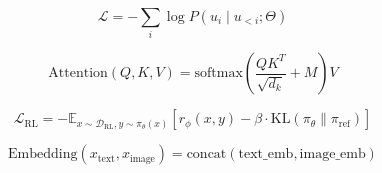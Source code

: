 
\begin{equation}
\mathcal{L} = -\sum_{i} \log P(u_i \mid u_{<i}; \Theta)
\end{equation}

\begin{equation}
\text{Attention}(Q, K, V) = \text{softmax}\left( \frac{QK^T}{\sqrt{d_k}} + M \right) V
\end{equation}

\begin{equation}
\mathcal{L}_{\text{RL}} = -\mathbb{E}_{x \sim \mathcal{D}_{\text{RL}}, y \sim \pi_{\theta}(x)}
\left[ r_{\phi}(x, y) - \beta \cdot \text{KL}\left( \pi_{\theta} \parallel \pi_{\text{ref}} \right) \right]
\end{equation}

\begin{equation}
\text{Embedding}(x_{\text{text}}, x_{\text{image}}) = \text{concat}(\text{text\_emb}, \text{image\_emb})
\end{equation}